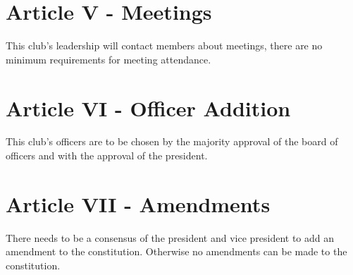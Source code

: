 \documentclass[a4, 12p]{article}
\begin{document}
\section*{Article V - Meetings}
This club's leadership will contact members about meetings, there are no minimum requirements for meeting attendance.

\section*{Article VI - Officer Addition}
This club's officers are to be chosen by the majority approval of the board of officers and with the approval of the president.

\section*{Article VII - Amendments}
There needs to be a consensus of the president and vice president to add an amendment to the constitution. Otherwise no amendments can be made to the constitution.
\end{document}
